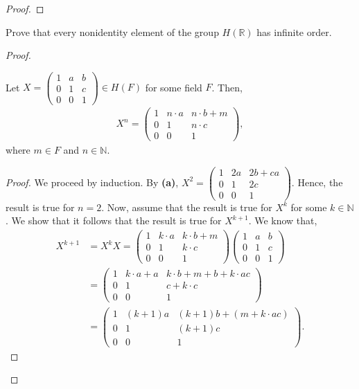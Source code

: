 \documentclass[12pt]{article}
\newcommand{\N}{\mathbb{N}}
\newcommand{\R}{\mathbb{R}}
\newenvironment{lemma}[2][Lemma]{\begin{trivlist} \item[\hskip \labelsep {\bfseries #1}\hskip \labelsep {\bfseries #2.}]}{\end{trivlist}}
\newenvironment{problem}[2][Problem]{\begin{trivlist} \item[\hskip \labelsep {\bfseries #1}\hskip \labelsep {\bfseries #2.}]}{\end{trivlist}}
\begin{document}
\begin{problem}{11}
\begin{enumerate}
\begin{proof}
\end{proof}
  \item Prove that every nonidentity element of the group $H(\R)$ has infinite order.
\begin{proof}
  \begin{lemma}{e.1}
    Let $X = \begin{pmatrix} 1 & a & b\\ 0 & 1 & c\\ 0 & 0 & 1\end{pmatrix}\in H(F)$ for some field $F$. Then,  
\begin{align*}
  X^{n} = \begin{pmatrix} 1 & n\cdot a & n\cdot b + m \\ 0 & 1 & n\cdot c\\ 0 & 0 & 1\end{pmatrix},
\end{align*}
where $m\in F$ and $n\in \N$.
\begin{proof}
  We proceed by induction. By \textbf{(a)}, $X^{2}=\begin{pmatrix} 1 & 2a & 2b+ca \\ 0 & 1 & 2c \\ 0 & 0 & 1\end{pmatrix}$. Hence, the result is true for $n=2$. Now, assume that the result is true for $X^{k}$ for some $k\in \N$. We show that it follows that the result is true for $X^{k+1}$. We know that, 
\begin{align*}
  X^{k+1} &= X^{k}X = \begin{pmatrix} 1 & k\cdot a & k\cdot b + m \\ 0 & 1 & k\cdot c \\ 0 & 0 & 1\end{pmatrix} \begin{pmatrix}1 & a & b \\ 0 & 1 & c \\ 0 & 0 &1\end{pmatrix}\\
  &=  \begin{pmatrix} 1 & k\cdot a + a & k\cdot b + m + b +k\cdot ac \\ 0 & 1 & c+k\cdot c\\ 0 & 0 & 1\end{pmatrix}\\
  &= \begin{pmatrix} 1 & (k+1)a & (k+1)b + (m+k\cdot ac)\\ 0 & 1 & (k+1)c\\ 0 & 0 & 1\end{pmatrix}.

\end{align*}
\end{proof}
\end{lemma}
\end{proof}
\end{enumerate}
\end{problem}
\end{document}
